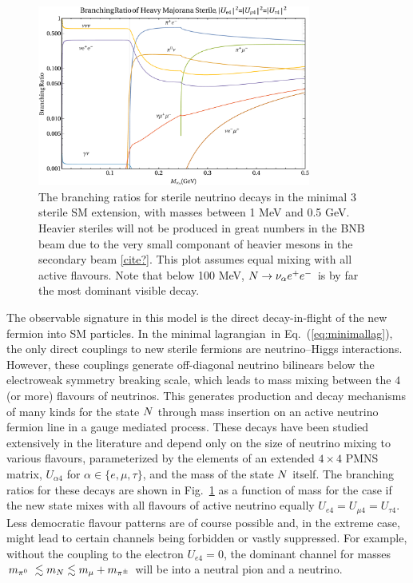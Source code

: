\documentclass[11pt, a4paper]{article}
\newcommand{\refeq}[1]{Eq.~(\ref{#1})}
\newcommand{\reffig}[1]{Fig.~\ref{#1}}
\def\lagrangian{lagrangian}
\def\ster{\ensuremath N}
\newcommand{\newtext}[2]{\textcolor{#1}{\ul{#2}}}
\begin{document}
\begin{figure}[t]
%
\centering
%
\includegraphics[width=0.8\textwidth]{figures/bounds1.pdf}
%
%
\caption{\label{fig:branchingratios}The branching ratios for sterile neutrino
decays in the minimal 3 sterile SM extension, with masses between 1 MeV and 0.5
GeV. Heavier steriles will not be produced in great numbers in the BNB beam due
to the very small componant of heavier mesons in the secondary beam \newtext{PB}{[cite?]}. This plot
assumes equal mixing with all active flavours. Note that below 100 MeV, $\ster
\rightarrow \nu_\alpha e^+ e^-$ is by far the most dominant visible decay.}
%
\end{figure}

The observable signature in this model is the direct decay-in-flight of the new
fermion into SM particles. In the minimal \lagrangian\ in
\refeq{eq:minimallag}, the only direct couplings to new sterile fermions are
neutrino--Higgs interactions. However, these couplings generate off-diagonal
neutrino bilinears below the electroweak symmetry breaking scale, which leads
to mass mixing between the $4$ (or more) flavours of neutrinos. This generates
production and decay mechanisms of many kinds for the state $\ster$ through
mass insertion on an active neutrino fermion line in a gauge mediated process.
These decays have been studied extensively in the literature \cite{Atre:2009rg}
and depend only on the size of neutrino mixing to various flavours,
parameterized by the elements of an extended $4\times4$ PMNS matrix,
%
$U_{\alpha 4}$ for $\alpha \in \{e,\mu,\tau\}$, 
%
and the mass of the state $\ster$ itself. The branching ratios for these decays
are shown in \reffig{fig:branchingratios} as a function of mass for the case if
the new state mixes with all flavours of active neutrino equally $U_{e4}=U_{\mu
4}=U_{\tau 4}$. Less democratic flavour patterns are of course possible and, in
the extreme case, might lead to certain channels being forbidden or vastly
suppressed. For example, without the coupling to the electron $U_{e4}=0$, the
dominant channel for masses $m_{\pi^0}~\lesssim m_\ster \lesssim
m_{\mu}+m_{\pi^\pm}$ will be into a neutral pion and a neutrino.
%
\end{document}
